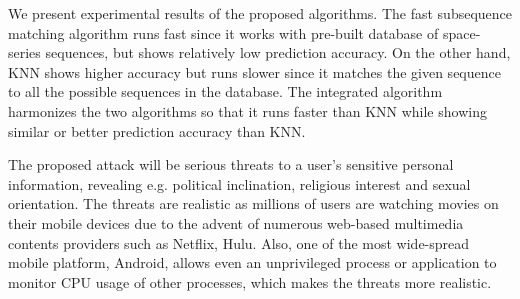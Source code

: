 We present experimental results of the proposed algorithms. The fast subsequence matching algorithm runs fast since it works with pre-built database of space-series sequences, but shows relatively low prediction accuracy.  On the other hand, KNN shows higher accuracy but runs slower since it matches the given sequence to all the possible sequences in the database.  The integrated algorithm harmonizes the two algorithms so that it runs faster than KNN while showing similar or better prediction accuracy than KNN. 

The proposed attack will be serious threats to a user's sensitive personal information, revealing e.g. political inclination, religious interest and sexual orientation. The threats are realistic as millions of users are watching movies on their mobile devices due to the advent of numerous web-based multimedia contents providers such as Netflix, Hulu. Also, one of the most wide-spread mobile platform, Android, allows even an unprivileged process or application to monitor CPU usage of other processes, which makes the threats more realistic. 